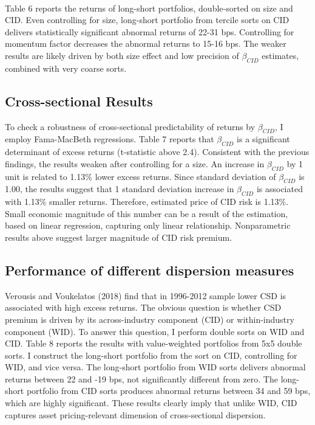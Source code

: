 \documentclass[12pt]{article}
\begin{document}
\paragraph{}
Table 6 reports the returns of long-short portfolios, double-sorted on size and CID. Even controlling for size, long-short portfolio from tercile sorts on CID delivers statistically significant abnormal returns of 22-31 bps. Controlling for momentum factor decreases the abnormal returns to 15-16 bps. The weaker results are likely driven by both size effect and low precision of $\beta_{CID}$ estimates, combined with very coarse sorts.

\subsection{Cross-sectional Results}

To check a robustness of cross-sectional predictability of returns by $\beta_{CID}$, I employ Fama-MacBeth regressions. Table 7 reports that $\beta_{CID}$ is a significant determinant of excess returns (t-statistic above 2.4). Consistent with the previous findings, the results weaken after controlling for a size. An increase in $\beta_{CID}$ by 1 unit is related to 1.13\% lower excess returns. Since standard deviation of $\beta_{CID}$ is 1.00, the results suggest that 1 standard deviation increase in $\beta_{CID}$ is associated with 1.13\% smaller returns. Therefore, estimated price of CID risk is 1.13\%. Small economic magnitude of this number can be a result of the estimation, based on linear regression, capturing only linear relationship. Nonparametric results above suggest larger magnitude of CID risk premium.

\subsection{Performance of different dispersion measures}

Verousis and Voukelatos (2018) find that in 1996-2012 sample lower CSD is associated with high excess returns. The obvious question is whether CSD premium is driven by its across-industry component (CID) or within-industry component (WID). To answer this question, I perform double sorts on WID and CID. Table 8 reports the results with value-weighted portfolios from 5x5 double sorts. I construct the long-short portfolio from the sort on CID, controlling for WID, and vice versa. The long-short portfolio from WID sorts delivers abnormal returns between 22 and -19 bps, not significantly different from zero. The long-short portfolio from CID sorts produces abnormal returns between 34 and 59 bps, which are highly significant. These results clearly imply that unlike WID, CID captures asset pricing-relevant dimension of cross-sectional dispersion. 
\end{document}

